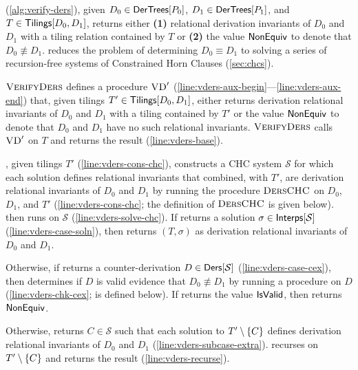 %
\verifyders (\autoref{alg:verify-ders}), given $D_0 \in
\mathsf{DerTrees}[ P_0 ]$, $D_1 \in \mathsf{DerTrees}[ P_1 ]$, and $T \in
\mathsf{Tilings}[ D_0, D_1 ]$, returns either \textbf{(1)} relational derivation
invariants of $D_0$ and $D_1$ with a tiling relation contained by $T$
or %
\textbf{(2)} the value $\mathsf{NonEquiv}$ to denote that $D_0 \not\equiv
D_1$.
%
\verifyders reduces the problem of determining $D_0 \equiv D_1$ to
solving a series of recursion-free systems of Constrained Horn Clauses
(\autoref{sec:chcs}).

$\textsc{VerifyDers}$ defines a procedure $\textsc{VD}'$
(\autoref{line:vders-aux-begin}---\autoref{line:vders-aux-end}) that,
given tilings $T' \in \mathsf{Tilings}[ D_0, D_1 ]$, either returns derivation
relational invariants of $D_0$ and $D_1$ with a tiling contained by
$T'$ or the value $\mathsf{NonEquiv}$ to denote that $D_0$ and $D_1$ have no
such relational invariants.
%
$\textsc{VerifyDers}$ calls $\textsc{VD}'$ on $T$ and returns the result
(\autoref{line:vders-base}).

\verifydersaux, given tilings $T'$ (\autoref{line:vders-cons-chc}),
constructs a CHC system $\mathcal{S}$ for which each solution defines
relational invariants that combined, with $T'$, are derivation
relational invariants of $D_0$ and $D_1$ by running the procedure
$\textsc{DersCHC}$ on $D_0$, $D_1$, and $T'$ (\autoref{line:vders-cons-chc};
%
the definition of $\textsc{DersCHC}$ is given below).
%
\verifydersaux then runs \solvechc on $\mathcal{S}$
(\autoref{line:vders-solve-chc}).
If \solvechc returns a solution $\sigma \in \mathsf{Interps[  \mathcal{S}  ]}$
(\autoref{line:vders-case-soln}), then \verifydersaux returns $(T,
\sigma)$ as derivation relational invariants of $D_0$ and $D_1$.

Otherwise, if \solvechc returns a counter-derivation $D \in \mathsf{Ders}[ 
  \mathcal{S}  ]$ (\autoref{line:vders-case-cex}), then \verifydersaux
determines if $D$ is valid evidence that $D_0 \not\equiv D_1$ by
running a procedure \isvalidcex on $D$ (\autoref{line:vders-chk-cex};
%
\isvalidcex is defined below).
If \isvalidcex returns the value $\mathsf{IsValid}$, then \verifydersaux
returns $\mathsf{NonEquiv}$.

Otherwise, \isvalidcex returns $C \in \mathcal{S}$ such that each
solution to $T' \setminus \{ C \}$ defines derivation relational invariants
of $D_0$ and $D_1$ (\autoref{line:vders-subcase-extra}).
%
\verifydersaux recurses on $T' \setminus \{ C \}$ and returns the result
(\autoref{line:vders-recurse}).

